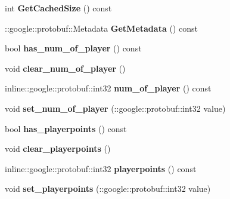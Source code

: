 \begin{DoxyCompactItemize}
\item 
\hypertarget{class_player_status_ab8f15398fd55d9c9beb952376db309c1}{int {\bfseries Get\-Cached\-Size} () const }\label{class_player_status_ab8f15398fd55d9c9beb952376db309c1}

\item 
\hypertarget{class_player_status_a3f6074ac088b9fdfc53961998908498c}{\-::google\-::protobuf\-::\-Metadata {\bfseries Get\-Metadata} () const }\label{class_player_status_a3f6074ac088b9fdfc53961998908498c}

\item 
\hypertarget{class_player_status_a87a6e0694705a02266e19a0431dcc8bd}{bool {\bfseries has\-\_\-num\-\_\-of\-\_\-player} () const }\label{class_player_status_a87a6e0694705a02266e19a0431dcc8bd}

\item 
\hypertarget{class_player_status_a4ad8dc674124a3f60415fdc42f9bb145}{void {\bfseries clear\-\_\-num\-\_\-of\-\_\-player} ()}\label{class_player_status_a4ad8dc674124a3f60415fdc42f9bb145}

\item 
\hypertarget{class_player_status_a44687f76d5e97b584660fbab2441b069}{inline\-::google\-::protobuf\-::int32 {\bfseries num\-\_\-of\-\_\-player} () const }\label{class_player_status_a44687f76d5e97b584660fbab2441b069}

\item 
\hypertarget{class_player_status_a629692934e938d6f22d32ea5e595d788}{void {\bfseries set\-\_\-num\-\_\-of\-\_\-player} (\-::google\-::protobuf\-::int32 value)}\label{class_player_status_a629692934e938d6f22d32ea5e595d788}

\item 
\hypertarget{class_player_status_ac13cb145ece1931f7cafb4ce6190a77f}{bool {\bfseries has\-\_\-playerpoints} () const }\label{class_player_status_ac13cb145ece1931f7cafb4ce6190a77f}

\item 
\hypertarget{class_player_status_aef1e2bbad803ac9ddcd33b3ee3f6bd98}{void {\bfseries clear\-\_\-playerpoints} ()}\label{class_player_status_aef1e2bbad803ac9ddcd33b3ee3f6bd98}

\item 
\hypertarget{class_player_status_a573842d49971874f154de31bcf52efb9}{inline\-::google\-::protobuf\-::int32 {\bfseries playerpoints} () const }\label{class_player_status_a573842d49971874f154de31bcf52efb9}

\item 
\hypertarget{class_player_status_a368618e48276a5d8bc2744578b0316cf}{void {\bfseries set\-\_\-playerpoints} (\-::google\-::protobuf\-::int32 value)}\label{class_player_status_a368618e48276a5d8bc2744578b0316cf}


\end{DoxyCompactItemize}
